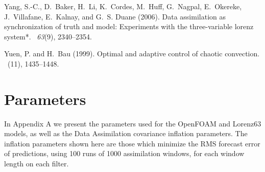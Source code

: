 \documentclass[12pt]{report}
\begin{document}
\begin{thebibliography}{}
Yang, S.-C., D.~Baker, H.~Li, K.~Cordes, M.~Huff, G.~Nagpal, E.~Okereke,
  J.~Villafane, E.~Kalnay, and G.~S. Duane (2006).
\newblock Data assimilation as synchronization of truth and model: Experiments
  with the three-variable lorenz system*.
~{\em 63\/}(9),
  2340--2354.

Yuen, P. and H.~Bau (1999).
\newblock Optimal and adaptive control of chaotic convection.
~(11), 1435--1448.

\end{thebibliography}

\appendix
\addappheadtotoc

\titleformat{\chapter}[hang]{\normalfont\huge\bfseries}{\chaptertitlename\ \thechapter:}{1em}{} 

\chapter{Parameters}
\label{params}

In Appendix A we present the parameters used for the OpenFOAM and Lorenz63 models, as well as the Data Assimilation covariance inflation parameters.
The inflation parameters shown here are those which minimize the RMS forecast error of predictions, using 100 runs of 1000 assimilation windows, for each window length on each filter.
\end{document}
